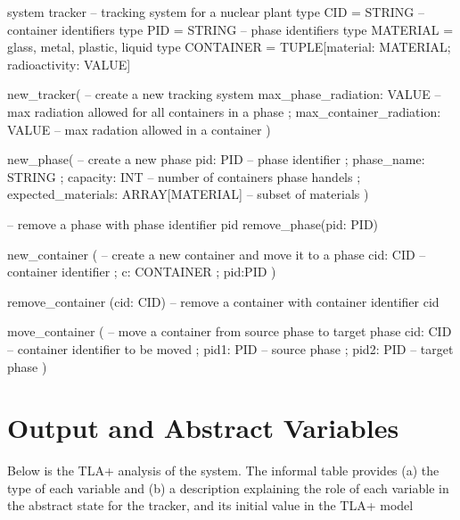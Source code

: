 \begin{events}
system tracker -- tracking system for a nuclear plant
type CID = STRING -- container identifiers
type PID = STRING -- phase identifiers
type MATERIAL = {glass, metal, plastic, liquid}
type CONTAINER = TUPLE[material: MATERIAL; radioactivity: VALUE]

new_tracker( -- create a new tracking system
	  max_phase_radiation: VALUE 
	  	-- max radiation allowed for all containers in a phase
	; max_container_radiation: VALUE 
		-- max radation allowed in a container
	)

new_phase( -- create a new phase
	  pid: PID            -- phase identifier
	; phase_name: STRING 
	; capacity: INT       -- number of containers phase handels
	; expected_materials: ARRAY[MATERIAL]  -- subset of materials
)

-- remove a phase with phase identifier pid
remove_phase(pid: PID)

new_container ( -- create a new container and move it to a phase
	  cid: CID  -- container identifier
	; c: CONTAINER
	; pid:PID
	)

remove_container (cid: CID) -- remove a container with container identifier cid

move_container ( -- move a container from source phase to target phase
	  cid: CID   -- container identifier to be moved
	; pid1: PID  -- source phase
	; pid2: PID  -- target phase
	)
\end{events}

\newpage
\section{Output and Abstract Variables}

Below is the TLA+ analysis of the system. The informal table provides (a) the type of each variable and (b) a description explaining the role of each variable in the abstract state for the tracker, and its initial value in the TLA+ model

\bigskip\bigskip

